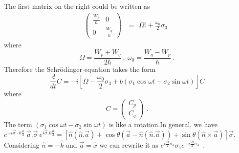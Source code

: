 The first matrix on the right could be written as
\begin{align}
\left( \begin{array}{cc}
\frac{W_p}{\hbar} & 0 \\
0 & \frac{W_q}{\hbar}
       \end{array} \right) %
                  & =
                    \begin{array}{cc}
           \Omega \mathbb{I} + \frac{\omega_0}{2} \sigma_3           
                    \end{array} 
\end{align}
where
\begin{equation}
\Omega=\frac{W_p+W_q}{2\hbar} ~,~
\omega_0=\frac{W_q-W_p}{\hbar}~.
\end{equation}
Therefore the Schr\"{o}dinger equation takes the form
\begin{equation}
\frac{d}{dt}C= -i \left[
\Omega -\frac{\omega_0}{2}\sigma_3 + b \left(\sigma_1 \cos{\omega t}  - \sigma_2\sin{\omega t}  \right) \right]C
\end{equation}
where
\begin{equation}
C=\left( \begin{array}{c}
C_p \\
C_q
\end{array}\right)~.
\end{equation}
The term $\left( \sigma_1\cos{\omega t}  - \sigma_2 \sin{\omega t}  \right)$ is like a rotation.In general, we have$
e^{-i \vec{\sigma}\cdot\hat{n} \frac{\theta}{2}}~ \vec{a}. \vec{\sigma} ~e^{i \vec{\sigma}.\hat{n} \frac{\theta}{2}}=\left[ \hat{n}(\hat{n}.\vec{a})+\cos\theta (\vec{a} - \hat{n} (\hat{n}.\vec{a}))+\sin \theta (\hat{n} \times \vec{a} )\right] \vec{\sigma}$. Considering $\hat{n}=-\hat{k}$ and $\vec{a}=\hat{x}$ we can rewrite it as $e^{i \frac{\omega t}{2} \sigma_3} \sigma_1 e^{-i \frac{\omega t}{2}\sigma_3}$~.
